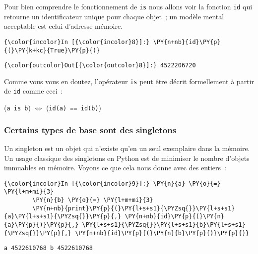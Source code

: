     Pour bien comprendre le fonctionnement de \texttt{is} nous allons voir
la fonction \texttt{id} qui retourne un identificateur unique pour
chaque objet~; un modèle mental acceptable est celui d'adresse mémoire.

    \begin{Verbatim}[commandchars=\\\{\}]
{\color{incolor}In [{\color{incolor}8}]:} \PY{n+nb}{id}\PY{p}{(}\PY{k+kc}{True}\PY{p}{)}
\end{Verbatim}


\begin{Verbatim}[commandchars=\\\{\}]
{\color{outcolor}Out[{\color{outcolor}8}]:} 4522206720
\end{Verbatim}
            
    Comme vous vous en doutez, l'opérateur \texttt{is} peut être décrit
formellement à partir de \texttt{id} comme ceci~:

(\texttt{a\ is\ b}) \(\Longleftrightarrow\) (\texttt{id(a)\ ==\ id(b)})

    \hypertarget{certains-types-de-base-sont-des-singletons}{%
\subsubsection{Certains types de base sont des
singletons}\label{certains-types-de-base-sont-des-singletons}}

    Un singleton est un objet qui n'existe qu'en un seul exemplaire dans la
mémoire. Un usage classique des singletons en Python est de minimiser le
nombre d'objets immuables en mémoire. Voyons ce que cela nous donne avec
des entiers~:

    \begin{Verbatim}[commandchars=\\\{\}]
{\color{incolor}In [{\color{incolor}9}]:} \PY{n}{a} \PY{o}{=} \PY{l+m+mi}{3}
        \PY{n}{b} \PY{o}{=} \PY{l+m+mi}{3}
        \PY{n+nb}{print}\PY{p}{(}\PY{l+s+s1}{\PYZsq{}}\PY{l+s+s1}{a}\PY{l+s+s1}{\PYZsq{}}\PY{p}{,} \PY{n+nb}{id}\PY{p}{(}\PY{n}{a}\PY{p}{)}\PY{p}{,} \PY{l+s+s1}{\PYZsq{}}\PY{l+s+s1}{b}\PY{l+s+s1}{\PYZsq{}}\PY{p}{,} \PY{n+nb}{id}\PY{p}{(}\PY{n}{b}\PY{p}{)}\PY{p}{)}
\end{Verbatim}


    \begin{Verbatim}[commandchars=\\\{\}]
a 4522610768 b 4522610768

    \end{Verbatim}

